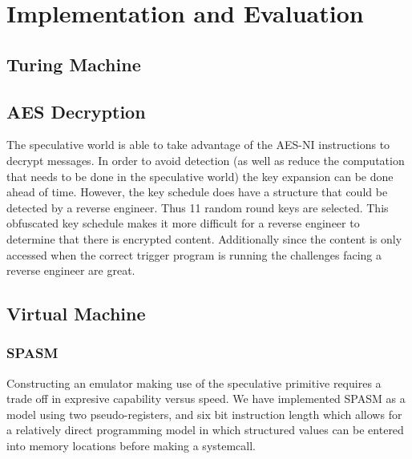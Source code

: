 
\section{Implementation and Evaluation}

\subsection{Turing Machine}



\subsection{AES Decryption}
The speculative world is able to take advantage of the AES-NI instructions to
decrypt messages. In order to avoid detection (as well as reduce the computation
that needs to be done in the speculative world) the key expansion can be done
ahead of time. However, the key schedule does have a structure that could be
detected by a reverse engineer. Thus 11 random round keys are selected. This
obfuscated key schedule makes it more difficult for a reverse engineer to
determine that there is encrypted content. Additionally since the content is
only accessed when the correct trigger program is running the challenges facing
a reverse engineer are great.
%

\subsection{Virtual Machine}


\subsubsection{SPASM}
\label{subsubsec:spasm}
Constructing an emulator making use of the speculative primitive requires  
a trade off in expresive capability versus speed. 
We have implemented SPASM as a model using two pseudo-registers, and six 
bit instruction length which allows for a relatively direct programming model 
in which structured values can be entered into memory locations before making 
a systemcall.

